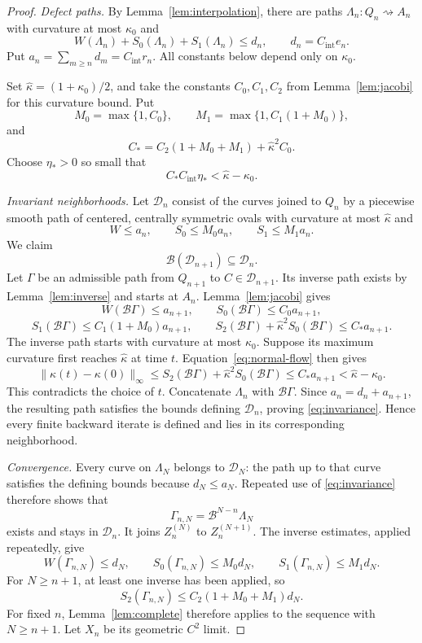 \documentclass[11pt]{article}
\numberwithin{equation}{section}
\newcommand{\Bmap}{\mathcal B}
\newcommand{\norm}[1]{\lVert #1\rVert}
\begin{document}
\begin{proof}
\emph{Defect paths.}
By Lemma~\ref{lem:interpolation}, there are paths
\(\Lambda_n:Q_n\rightsquigarrow A_n\) with curvature at most \(\kappa_0\)
and
\[
  W(\Lambda_n)+S_0(\Lambda_n)+S_1(\Lambda_n)\leq d_n,
  \qquad d_n=C_{\mathrm{int}}e_n.
\]
Put \(a_n=\sum_{m\geq n}d_m=C_{\mathrm{int}}r_n\). All constants below
depend only on \(\kappa_0\).

Set \(\widehat\kappa=(1+\kappa_0)/2\), and take the constants
\(C_0,C_1,C_2\) from Lemma~\ref{lem:jacobi} for this curvature bound. Put
\[
  M_0=\max\{1,C_0\},\qquad
  M_1=\max\{1,C_1(1+M_0)\},
\]
and
\[
  C_*=C_2(1+M_0+M_1)+\widehat\kappa^2C_0.
\]
Choose \(\eta_*>0\) so small that
\begin{equation}\label{eq:smallness}
  C_*C_{\mathrm{int}}\eta_*<\widehat\kappa-\kappa_0.
\end{equation}

\emph{Invariant neighborhoods.}
Let \(\mathcal D_n\) consist of the curves joined to \(Q_n\) by a
piecewise smooth path of centered, centrally symmetric ovals with curvature
at most \(\widehat\kappa\) and
\[
  W\leq a_n,\qquad S_0\leq M_0a_n,\qquad S_1\leq M_1a_n.
\]
We claim
\begin{equation}\label{eq:invariance}
  \Bmap(\mathcal D_{n+1})\subseteq\mathcal D_n.
\end{equation}
Let \(\Gamma\) be an admissible path from \(Q_{n+1}\) to
\(C\in\mathcal D_{n+1}\). Its inverse path exists by
Lemma~\ref{lem:inverse} and starts at \(A_n\).
Lemma~\ref{lem:jacobi} gives
\[
  W(\Bmap\Gamma)\leq a_{n+1},\qquad
  S_0(\Bmap\Gamma)\leq C_0a_{n+1},
\]
\[
  S_1(\Bmap\Gamma)\leq C_1(1+M_0)a_{n+1},\qquad
  S_2(\Bmap\Gamma)+\widehat\kappa^2S_0(\Bmap\Gamma)\leq C_*a_{n+1}.
\]
The inverse path starts with curvature at most \(\kappa_0\). Suppose its
maximum curvature first reaches \(\widehat\kappa\) at time \(t\).
Equation~\eqref{eq:normal-flow} then gives
\[
  \norm{\kappa(t)-\kappa(0)}_\infty
  \leq S_2(\Bmap\Gamma)+\widehat\kappa^2S_0(\Bmap\Gamma)
  \leq C_*a_{n+1}<\widehat\kappa-\kappa_0.
\]
This contradicts the choice of \(t\). Concatenate \(\Lambda_n\) with
\(\Bmap\Gamma\). Since \(a_n=d_n+a_{n+1}\), the resulting path satisfies
the bounds defining \(\mathcal D_n\), proving \eqref{eq:invariance}. Hence
every finite backward iterate is defined and lies in its corresponding
neighborhood.

\emph{Convergence.}
Every curve on \(\Lambda_N\) belongs to \(\mathcal D_N\): the path up to
that curve satisfies the defining bounds because \(d_N\leq a_N\). Repeated
use of \eqref{eq:invariance} therefore shows that
\[
  \Gamma_{n,N}=\Bmap^{N-n}\Lambda_N
\]
exists and stays in \(\mathcal D_n\). It joins \(Z_n^{(N)}\) to
\(Z_n^{(N+1)}\). The inverse estimates, applied repeatedly, give
\[
  W(\Gamma_{n,N})\leq d_N,\qquad
  S_0(\Gamma_{n,N})\leq M_0d_N,\qquad
  S_1(\Gamma_{n,N})\leq M_1d_N.
\]
For \(N\geq n+1\), at least one inverse has been applied, so
\[
  S_2(\Gamma_{n,N})\leq C_2(1+M_0+M_1)d_N.
\]
For fixed \(n\), Lemma~\ref{lem:complete} therefore applies to the sequence
with \(N\geq n+1\). Let \(X_n\) be its geometric \(C^2\) limit.


\end{proof}
\end{document}
